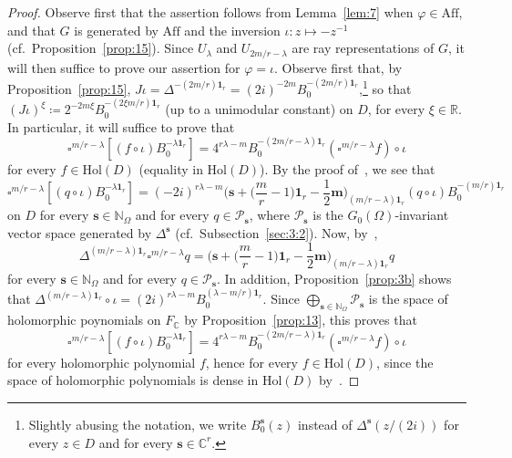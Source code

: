 \documentclass[10.5pt,reqno]{amsart}
\newcommand{\Aff}{\mathrm{Aff}}
\newcommand{\Hol}{\mathrm{Hol}}
\newcommand{\vect}[1]{\mathbf{{#1}}}
\newcommand{\N}{\mathds{N}}
\newcommand{\C}{\mathds{C}}
\newcommand{\R}{\mathds{R}}
\newcommand{\Pc}{\mathcal{P}}
\renewcommand{\phi}{\varphi}
\begin{document}
\begin{proof}
	Observe first that the assertion follows from Lemma~\ref{lem:7} when $\phi\in \Aff$, and that $G$ is generated by $\Aff$ and the inversion $\iota\colon z \mapsto -z^{-1}$ (cf.~Proposition~\ref{prop:15}). Since  $U_\lambda$ and $U_{2m/r-\lambda}$ are ray representations of $G$, it will then suffice to prove our assertion for $\phi=\iota$.
	Observe first that, by Proposition~\ref{prop:15}, $J\iota =\Delta^{-(2 m/r) \vect 1_r} = (2i)^{-2m} B_0^{-(2m/r)\vect 1_r}$,\footnote{Slightly abusing the notation, we write $B_0^{\vect s}(z)$ instead of $\Delta^{\vect s}(z/(2i))$ for every $z\in D$ and for every $\vect s\in \C^r$.} so that  $(J \iota)^\xi\coloneqq 2^{-2 m \xi} B_0^{-(2 \xi m/r) \vect 1_r}$ (up to a unimodular constant) on $D$, for every $\xi\in \R$. In particular, it will suffice to prove that
	\[
	\square^{m/r-\lambda} [(f\circ \iota)B_0^{- \lambda  \vect 1_r} ]=4^{r\lambda- m} B_0^{- (2 m/r-\lambda) \vect 1_r}  (\square^{m/r-\lambda} f)\circ \iota
	\]
	for every $f\in \Hol(D)$ (equality in $\Hol(D)$). By the proof of~\cite[Lemma 3.8]{Garrigos}, we see that
	\[
	\square^{m/r-\lambda} [(q\circ \iota)B_0^{- \lambda  \vect 1_r} ]=(-2 i)^{r\lambda-m} 	\Big( \vect s+\Big(\frac m r -1\Big)\vect 1_r -\frac 1 2 \vect m\Big)_{(m/r-\lambda)\vect 1_r} (q\circ \iota) B_0^{-(m/r)\vect 1_r}
	\]
	on $D$ for every $\vect s\in \N_\Omega$ and for every $q\in \Pc_{\vect s}$, where $\Pc_{\vect s}$ is the $G_0(\Omega)$-invariant vector space generated by $\Delta^{\vect s}$ (cf.~Subsection~\ref{sec:3:2}). Now, by~\cite[Lemma XIV.2.1]{FarautKoranyi},
	\[
	\Delta^{(m/r-\lambda)\vect 1_r} \square^{m/r-\lambda} q=	\Big( \vect s+\Big(\frac m r -1\Big)\vect 1_r -\frac 1 2 \vect m\Big)_{(m/r-\lambda)\vect 1_r} q
	\]
	for every $\vect s\in \N_\Omega$ and for every $q\in \Pc_{\vect s}$. In addition, Proposition~\ref{prop:3b} shows that $\Delta^{(m/r-\lambda)\vect 1_r}\circ\iota=(2 i)^{r\lambda-m} B^{(\lambda-m/r)\vect 1_r}_0$.
	Since $\bigoplus_{\vect s\in \N_\Omega} \Pc_{\vect s}$ is the space of holomorphic poynomials  on $F_\C$ by Proposition~\ref{prop:13}, this proves that
	\[
	\square^{m/r-\lambda} [(f\circ \iota)B_0^{- \lambda  \vect 1_r} ]= 4^{r\lambda-m}B_0^{- (2 m/r-\lambda) \vect 1_r}  (\square^{m/r-\lambda} f)\circ \iota
	\]
	for every holomorphic polynomial $f$, hence for every $f\in \Hol(D)$, since the space of holomorphic polynomials is dense in $\Hol(D)$ by~\cite[Corollary 7.2]{Rango1}.
\end{proof}
\end{document}
